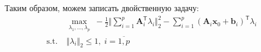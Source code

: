 \documentclass[a4paper,12pt]{article}
\renewcommand{\leq}{\leqslant}
\renewcommand{\top}{\mathsf{T}}
\begin{document}
\begin{enumerate}
Таким образом, можем записать двойственную задачу:
\begin{equation*}
	\begin{aligned}
		& \max\limits_{\lambda_1,...,\lambda_p}\;- \frac{1}{2}\Vert \sum\limits_{i=1}^p\mathbf{A}_i^\top \lambda_i \Vert_2^2 -\sum\limits_{i=1}^p(\mathbf{A}_i\mathbf{x}_0 + \mathbf{b}_i)^\top\lambda_i\\
		\text{s.t.}\; & \Vert\lambda_i\Vert_2 \leq 1,\;i=\overline{1,p}
	\end{aligned}
\end{equation*}

	
	\end{enumerate}
	
	
	
\end{document}
